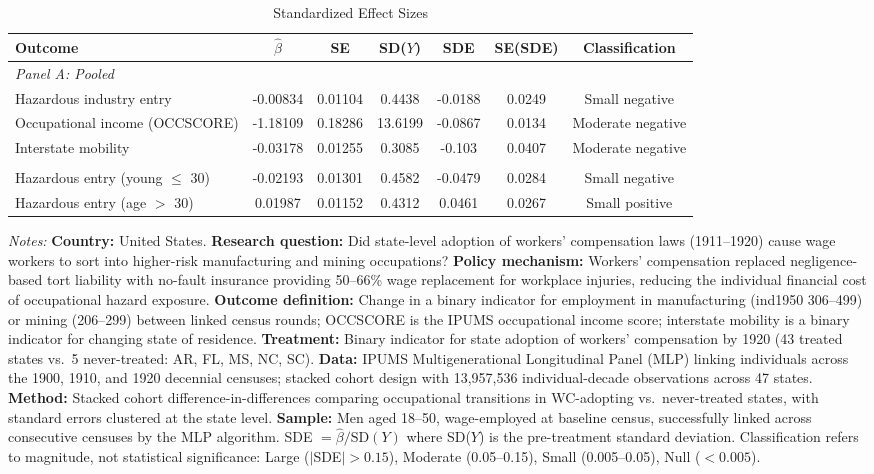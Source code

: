 \begin{table}[t]
\centering
\caption{Standardized Effect Sizes}
\label{tab:sde}
\begin{adjustbox}{max width=\textwidth}
\begin{threeparttable}
\begin{tabular}{@{}lcccccc@{}}
\toprule
Outcome & $\hat{\beta}$ & SE & SD($Y$) & SDE & SE(SDE) & Classification \\
\midrule
\multicolumn{7}{l}{\textit{Panel A: Pooled}} \\
\addlinespace
Hazardous industry entry & -0.00834 & 0.01104 & 0.4438 & -0.0188 & 0.0249 & Small negative \\
Occupational income (OCCSCORE) & -1.18109 & 0.18286 & 13.6199 & -0.0867 & 0.0134 & Moderate negative \\
Interstate mobility & -0.03178 & 0.01255 & 0.3085 & -0.103 & 0.0407 & Moderate negative \\
\addlinespace
\multicolumn{7}{l}{\textit{Panel B: Heterogeneous (by age)}} \\
\addlinespace
Hazardous entry (young $\leq$ 30) & -0.02193 & 0.01301 & 0.4582 & -0.0479 & 0.0284 & Small negative \\
Hazardous entry (age $>$ 30) & 0.01987 & 0.01152 & 0.4312 & 0.0461 & 0.0267 & Small positive \\
\bottomrule
\end{tabular}
\begin{tablenotes}[flushleft]
\small
\item \textit{Notes:} \textbf{Country:} United States. \textbf{Research question:} Did state-level adoption of workers' compensation laws (1911--1920) cause wage workers to sort into higher-risk manufacturing and mining occupations? \textbf{Policy mechanism:} Workers' compensation replaced negligence-based tort liability with no-fault insurance providing 50--66\% wage replacement for workplace injuries, reducing the individual financial cost of occupational hazard exposure. \textbf{Outcome definition:} Change in a binary indicator for employment in manufacturing (ind1950 306--499) or mining (206--299) between linked census rounds; OCCSCORE is the IPUMS occupational income score; interstate mobility is a binary indicator for changing state of residence. \textbf{Treatment:} Binary indicator for state adoption of workers' compensation by 1920 (43 treated states vs.\ 5 never-treated: AR, FL, MS, NC, SC). \textbf{Data:} IPUMS Multigenerational Longitudinal Panel (MLP) linking individuals across the 1900, 1910, and 1920 decennial censuses; stacked cohort design with 13,957,536 individual-decade observations across 47 states. \textbf{Method:} Stacked cohort difference-in-differences comparing occupational transitions in WC-adopting vs.\ never-treated states, with standard errors clustered at the state level. \textbf{Sample:} Men aged 18--50, wage-employed at baseline census, successfully linked across consecutive censuses by the MLP algorithm. SDE $= \hat{\beta} / \text{SD}(Y)$ where SD($Y$) is the pre-treatment standard deviation. Classification refers to magnitude, not statistical significance: Large ($|$SDE$| > 0.15$), Moderate (0.05--0.15), Small (0.005--0.05), Null ($< 0.005$).

\end{tablenotes}
\end{threeparttable}
\end{adjustbox}
\end{table}
